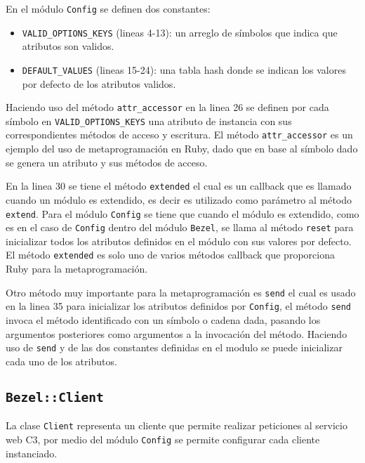 En el módulo \texttt{Config} se definen dos constantes:

\begin{itemize}
\item \texttt{VALID\_OPTIONS\_KEYS} (lineas 4-13): un arreglo de símbolos que indica
  que atributos son validos.
\item \texttt{DEFAULT\_VALUES} (lineas 15-24): una tabla hash donde se indican los
  valores por defecto de los atributos validos.
\end{itemize}

Haciendo uso del método \texttt{attr\_accessor} en la linea 26 se definen por cada
símbolo en \texttt{VALID\_OPTIONS\_KEYS} una atributo de instancia con sus
correspondientes métodos de acceso y escritura. El método \texttt{attr\_accessor} es
un ejemplo del uso de metaprogramación en Ruby, dado que en base al símbolo dado se
genera un atributo y sus métodos de acceso.


En la linea 30 se tiene el método \texttt{extended} el cual es un callback que es
llamado cuando un módulo es extendido, es decir es utilizado como parámetro al
método \texttt{extend}. Para el módulo \texttt{Config} se tiene que cuando el módulo
es extendido, como es en el caso de \texttt{Config} dentro del módulo \texttt{Bezel},
se llama al método \texttt{reset} para inicializar todos los atributos definidos en
el módulo con sus valores por defecto. El método \texttt{extended} es solo uno
de varios métodos callback que proporciona Ruby para la metaprogramación.

Otro método muy importante para la metaprogramación es \texttt{send} el cual es usado
en la linea 35 para inicializar los atributos definidos por \texttt{Config}, el
método \texttt{send} invoca el método identificado con un símbolo o cadena dada,
pasando los argumentos posteriores como argumentos a la invocación del método.
Haciendo uso de \texttt{send} y de las dos constantes definidas en el modulo
se puede inicializar cada uno de los atributos.

\subsection{\texttt{Bezel::Client}}

La clase \texttt{Client} representa un cliente que permite realizar peticiones al 
servicio web C3, por medio del módulo \texttt{Config} se permite configurar
cada cliente instanciado.

